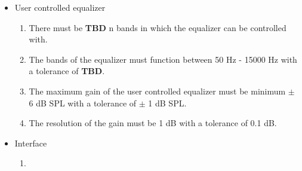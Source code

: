 \begin{itemize}
\item User controlled equalizer
\begin{enumerate}
\item There must be \textbf{TBD} n bands in which the equalizer can be controlled with. 
\item The bands of the equalizer must function between 50 Hz - 15000 Hz with a tolerance of \textbf{TBD}. 
\item The maximum gain of the user controlled equalizer must be minimum $\pm$ 6 dB SPL with a tolerance of $\pm$ 1 dB SPL.
\item The resolution of the gain must be 1 dB with a tolerance of 0.1 dB.
\end{enumerate}
\end{itemize}

\begin{itemize}
\item Interface
\begin{enumerate}
\item 
\end{enumerate}
\end{itemize}
